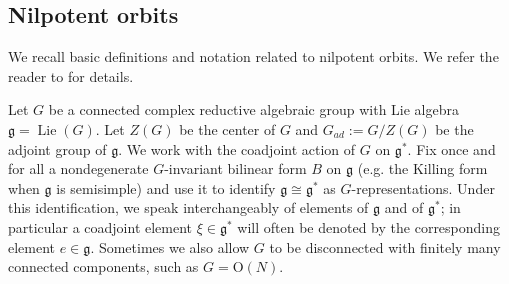 \documentclass[11pt, a4paper]{amsart}
\newcommand{\U}{\mathcal{U}}
\newcommand{\g}{\mathfrak{g}}
\newcommand{\fk}{\mathfrak{k}}
\DeclareMathOperator{\Lie}{Lie}
\newcommand{\R}{\mathbb{R}}
\newcommand{\GR}{G_\R}
\newcommand{\KR}{K_\R}
\theoremstyle{definition}
\numberwithin{equation}{section}
\begin{document}




\subsection{Nilpotent orbits}\label{subsec:nil_orbits}

We recall basic definitions and notation related to nilpotent orbits. We refer the reader to \cite{CM} for details.

Let $G$ be a connected complex reductive algebraic group with Lie algebra $\g=\Lie(G)$. Let $Z(G)$ be the center of $G$ and $G_{ad} := G/Z(G)$ be the adjoint group of $\g$. We work with the coadjoint action of $G$ on $\g^*$. Fix once and for all a nondegenerate $G$-invariant bilinear form $B$ on $\g$ (e.g. the Killing form when $\g$ is semisimple) and use it to identify $\g\cong\g^*$ as $G$-representations. Under this identification, we speak interchangeably of elements of $\g$ and of $\g^*$; in particular a coadjoint element $\xi\in\g^*$ will often be denoted by the corresponding element $e\in\g$. Sometimes we also allow $G$ to be disconnected with finitely many connected components, such as $G=\mathrm{O}(N)$.
\end{document}
